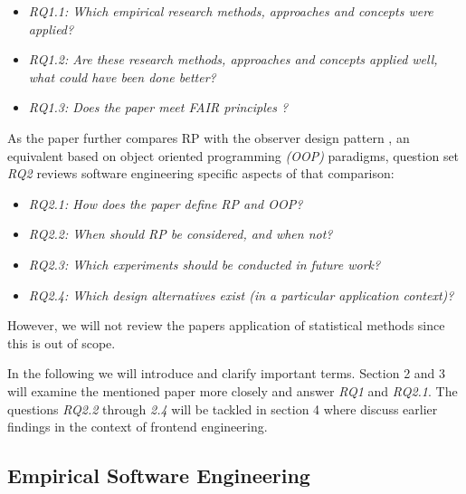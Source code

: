 \documentclass[12pt,a4paper]{article}
\begin{document}
\begin{itemize}
	\item \emph{RQ1.1: Which empirical research methods, approaches and concepts were applied?}
	\item \emph{RQ1.2: Are these research methods, approaches and concepts applied well, what could have been done better?}
	\item \emph{RQ1.3: Does the paper meet FAIR principles \cite{2019arXiv190805986H} \cite{wilkinson:2016}?}
\end{itemize}

As the paper further compares RP with the observer design pattern \cite{gamma1995design}, an equivalent based on object oriented programming \emph{(OOP)} paradigms, question set \emph{RQ2} reviews software engineering specific aspects of that comparison:

\begin{itemize}
	\item \emph{RQ2.1: How does the paper define RP and OOP?}
	\item \emph{RQ2.2: When should RP be considered, and when not?}
	\item \emph{RQ2.3: Which experiments should be conducted in future work?}
	\item \emph{RQ2.4: Which design alternatives exist (in a particular application context)?}
\end{itemize}

However, we will not review the papers application of statistical methods since this is out of scope.

In the following we will introduce and clarify important terms. Section 2 and 3 will examine the mentioned paper more closely and answer \emph{RQ1} and \emph{RQ2.1}. The questions \emph{RQ2.2} through \emph{2.4} will be tackled in section 4 where discuss earlier findings in the context of frontend engineering.

\subsection{Empirical Software Engineering}
\end{document}
